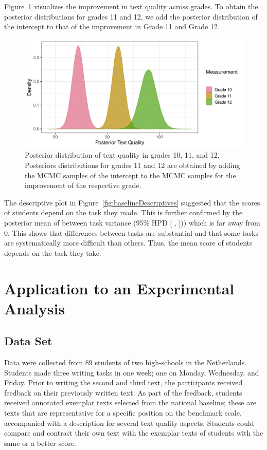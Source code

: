 \documentclass[a4paper]{article}
\newcommand{\getVal}[3]{%
	\pgfplotstablegetelem{#1}{#2}\of{#3}%
	\pgfmathprintnumber{\pgfplotsretval}%
}
\newcommand{\getCI}[2]{95\% HPD [\getVal{#1}{Lower}{#2}, \getVal{#1}{Upper}{#2}]}
\begin{document}
Figure~\ref{fig:baselinePosteriorTextQuality} visualizes the improvement in text quality across grades. To obtain the posterior distributions for grades 11 and 12, we add the posterior distribution of the intercept to that of the improvement in Grade 11 and Grade 12.
\begin{figure}[!ht]
	\includegraphics[width=\textwidth]{posteriorTextQualityBaseline}
	\caption{Posterior distribution of text quality in grades 10, 11, and 12. Posteriors distributions for grades 11 and 12 are obtained by adding the MCMC samples of the intercept to the MCMC samples for the improvement of the respective grade.}
	\label{fig:baselinePosteriorTextQuality}
\end{figure}

The descriptive plot in Figure~\ref{fig:baselineDescriptives} suggested that the scores of students depend on the task they made. This is further confirmed by the posterior mean of between task variance \getVal{5}{Mean}{\tbPostSummaryBaseline} (\getCI{5}{\tbPostSummaryBaseline})) which is far away from 0. This shows that differences between tasks are substantial and that some tasks are systematically more difficult than others. Thus, the mean score of students depends on the task they take.

\section*{Application to an Experimental Analysis}

\subsection*{Data Set}
Data were collected from 89 students of two high-schools in the Netherlands.
Students made three writing tasks in one week; one on Monday, Wednesday, and Friday.
Prior to writing the second and third text, the participants received feedback on their previously written text.
As part of the feedback, students received annotated exemplar texts selected from the national baseline; these are texts that are representative for a specific position on the benchmark scale, accompanied with a description for several text quality aspects.
Students could compare and contrast their own text with the exemplar texts of students with the same or a better score.
\end{document}
